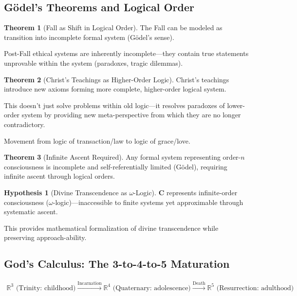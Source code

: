 \documentclass[11pt,a4paper]{article}
\theoremstyle{definition}
\newtheorem{theorem}{Theorem}[section]
\newtheorem{hypothesis}{Hypothesis}[section]
\theoremstyle{remark}
\newcommand{\RR}{\mathbb{R}}
\begin{document}
\subsection{Gödel's Theorems and Logical Order}

\begin{theorem}[Fall as Shift in Logical Order]
The Fall can be modeled as transition into incomplete formal system (Gödel's sense).

Post-Fall ethical systems are inherently incomplete—they contain true statements unprovable within the system (paradoxes, tragic dilemmas).
\end{theorem}

\begin{theorem}[Christ's Teachings as Higher-Order Logic]
Christ's teachings introduce new axioms forming more complete, higher-order logical system.

This doesn't just solve problems within old logic—it resolves paradoxes of lower-order system by providing new meta-perspective from which they are no longer contradictory.

Movement from logic of transaction/law to logic of grace/love.
\end{theorem}

\begin{theorem}[Infinite Ascent Required]
Any formal system representing order-\(n\) consciousness is incomplete and self-referentially limited (Gödel), requiring infinite ascent through logical orders.
\end{theorem}

\begin{hypothesis}[Divine Transcendence as \(\omega\)-Logic]
\(\mathbf{C}\) represents infinite-order consciousness (\(\omega\)-logic)—inaccessible to finite systems yet approximable through systematic ascent.

This provides mathematical formalization of divine transcendence while preserving approach-ability.
\end{hypothesis}

\subsection{God's Calculus: The 3-to-4-to-5 Maturation}

\begin{align}
\RR^3 \text{ (Trinity: childhood)} \xrightarrow{\text{Incarnation}} \RR^4 \text{ (Quaternary: adolescence)} \xrightarrow{\text{Death}} \RR^5 \text{ (Resurrection: adulthood)}
\end{align}
\end{document}
